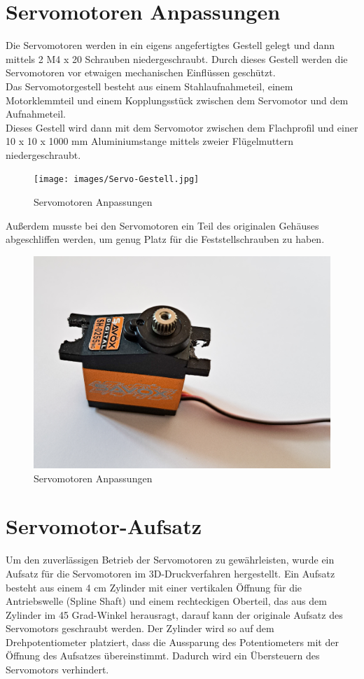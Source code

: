 \section{Servomotoren Anpassungen}
Die Servomotoren werden in ein eigens angefertigtes Gestell gelegt und dann mittels 2 M4 x 20 Schrauben niedergeschraubt. Durch dieses Gestell werden die Servomotoren vor etwaigen mechanischen Einflüssen geschützt. \\
Das Servomotorgestell besteht aus einem Stahlaufnahmeteil, einem Motorklemmteil und einem Kopplungsstück zwischen dem Servomotor und dem Aufnahmeteil.\\
Dieses Gestell wird dann mit dem Servomotor zwischen dem Flachprofil und einer 10 x 10 x 1000 mm Aluminiumstange mittels zweier Flügelmuttern niedergeschraubt.\\
\begin{figure}[H]
	\centering
	\texttt{[image: images/Servo-Gestell.jpg]}
	\caption[Servomotoren Anpassungen]{Servomotoren Anpassungen}
	\label{fig:Servomotoren Gestell}
\end{figure}

\newpage
Außerdem musste bei den Servomotoren ein Teil des originalen Gehäuses abgeschliffen werden, um genug Platz für die Feststellschrauben zu haben.

\begin{figure}[H]
	\centering
	\includegraphics[width=0.5\linewidth]{images/Servo-Anpassungen.jpg}
	\caption[Servomotoren Anpassungen]{Servomotoren Anpassungen}
	\label{fig:Servomotoren Anpassungen}
\end{figure}


\section{Servomotor-Aufsatz}
Um den zuverlässigen Betrieb der Servomotoren zu gewährleisten, wurde ein Aufsatz für die Servomotoren im 3D-Druckverfahren hergestellt. Ein Aufsatz besteht aus einem 4 cm Zylinder mit einer vertikalen Öffnung für die  Antriebswelle (Spline Shaft)  und einem rechteckigen Oberteil, das aus dem Zylinder im 45 Grad-Winkel herausragt, darauf kann der originale Aufsatz des Servomotors geschraubt werden. Der Zylinder wird so auf dem Drehpotentiometer platziert, dass die Aussparung des Potentiometers mit der Öffnung des Aufsatzes übereinstimmt. Dadurch wird ein Übersteuern des Servomotors verhindert.

